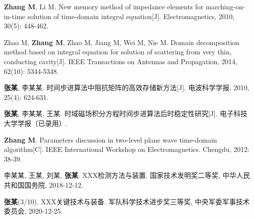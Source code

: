 \uestcachievements


{\small
\begin{enumerate}[
    label={\textup{[\arabic*]}},
    labelwidth=2em,
    labelsep=.5em,
    leftmargin=2.5em,
    align=left,
    topsep=0pt,
    partopsep=0pt,
    itemsep=0pt,
    parsep=0pt
]
    \item \textbf{Zhang M}, Li M. New memory method of impedance elements for marching-on-in-time solution of time-domain integral equation[J]. Electromagnetics, 2010, 30(5): 448-462.
    \item Zhao M, \textbf{Zhang M}, Zhao M, Jiang M, Wei M, Nie M. Domain decomposition method based on integral equation for solution of scattering from very thin, conducting cavity[J]. IEEE Transactions on Antennas and Propagation, 2014, 62(10): 5344-5348.
    \item \textbf{张某}, 李某某. 时间步进算法中阻抗矩阵的高效存储新方法[J]. 电波科学学报. 2010, 25(4): 624-631.
    \item \textbf{张某}, 李某某, 王某. 时域磁场积分方程时间步进算法后时稳定性研究[J]. 电子科技大学学报（已录用）.
    \item \textbf{Zhang M}. Parameters discussion in two-level plane wave time-domain algorithm[C]. IEEE International Workshop on Electromagnetics. Chengdu, 2012: 38-39.
    \item 李某某, 王某, 刘某, \textbf{张某}. XXX检测方法与装置. 国家技术发明奖二等奖, 中华人民共和国国务院, 2018-12-12.
    \item \textbf{张某}(3/10). XXX关键技术与装备. 军队科学技术进步奖三等奖, 中央军委军事技术委员会, 2020-12-25.
\end{enumerate}
}
